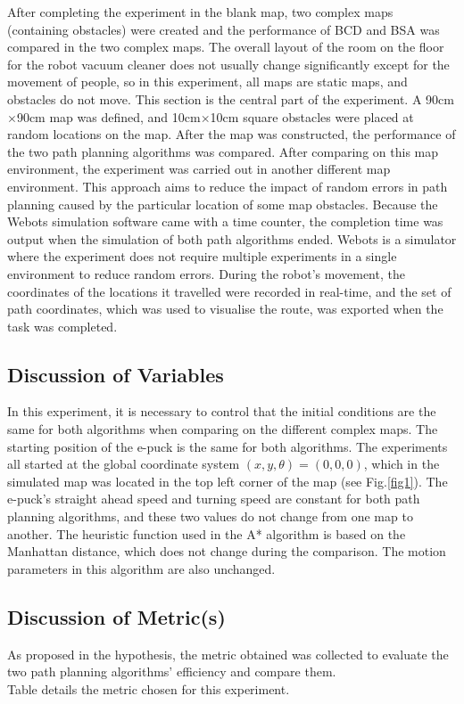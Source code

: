 \documentclass[conference]{IEEEtran}
\begin{document}
After completing the experiment in the blank map, two complex maps (containing obstacles) were created and the performance of BCD and BSA was compared in the two complex maps. The overall layout of the room on the floor for the robot vacuum cleaner does not usually change significantly except for the movement of people, so in this experiment, all maps are static maps, and obstacles do not move. This section is the central part of the experiment. A 90cm$\times$90cm map was defined, and 10cm$\times$10cm square obstacles were placed at random locations on the map. After the map was constructed, the performance of the two path planning algorithms was compared. After comparing on this map environment, the experiment was carried out in another different map environment. This approach aims to reduce the impact of random errors in path planning caused by the particular location of some map obstacles. Because the Webots simulation software came with a time counter, the completion time was output when the simulation of both path algorithms ended. Webots is a simulator where the experiment does not require multiple experiments in a single environment to reduce random errors. During the robot's movement, the coordinates of the locations it travelled were recorded in real-time, and the set of path coordinates, which was used to visualise the route, was exported when the task was completed.
\subsection{Discussion of Variables}
In this experiment, it is necessary to control that the initial conditions are the same for both algorithms when comparing on the different complex maps. The starting position of the e-puck is the same for both algorithms. The experiments all started at the global coordinate system $(x, y, \theta) = (0, 0, 0)$, which in the simulated map was located in the top left corner of the map (see Fig.\ref{fig1}). The e-puck's straight ahead speed and turning speed are constant for both path planning algorithms, and these two values do not change from one map to another. The heuristic function used in the A* algorithm is based on the Manhattan distance, which does not change during the comparison. The motion parameters in this algorithm are also unchanged.

\subsection{Discussion of Metric(s)}
As proposed in the hypothesis, the metric obtained was collected to evaluate the two path planning algorithms' efficiency and compare them. \\
Table \uppercase\expandafter{} details the metric chosen for this experiment.
\end{document}
